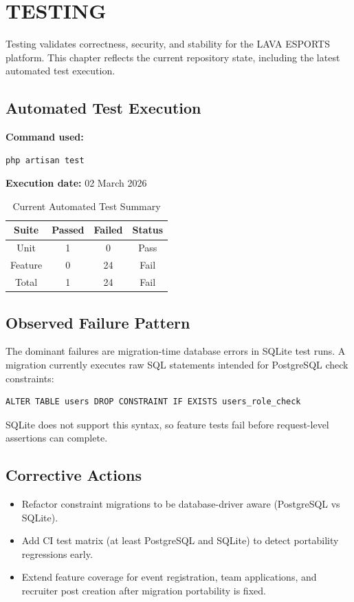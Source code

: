 \chapter{TESTING}
Testing validates correctness, security, and stability for the LAVA ESPORTS platform. This chapter reflects the current repository state, including the latest automated test execution.

\section{Automated Test Execution}
\textbf{Command used:}
\begin{verbatim}
php artisan test
\end{verbatim}

\textbf{Execution date:} 02 March 2026

\begin{table}[htbp]
    \centering
    \renewcommand{\arraystretch}{1.3}
    \begin{tabular}{|c|c|c|c|}
        \hline
        \textbf{Suite} & \textbf{Passed} & \textbf{Failed} & \textbf{Status} \\
        \hline
        Unit & 1 & 0 & Pass \\
        \hline
        Feature & 0 & 24 & Fail \\
        \hline
        Total & 1 & 24 & Fail \\
        \hline
    \end{tabular}
    \caption{Current Automated Test Summary}
    \label{tab:test_summary}
\end{table}

\section{Observed Failure Pattern}
The dominant failures are migration-time database errors in SQLite test runs. A migration currently executes raw SQL statements intended for PostgreSQL check constraints:
\begin{verbatim}
ALTER TABLE users DROP CONSTRAINT IF EXISTS users_role_check
\end{verbatim}
SQLite does not support this syntax, so feature tests fail before request-level assertions can complete.

\section{Corrective Actions}
\begin{itemize}
    \item Refactor constraint migrations to be database-driver aware (PostgreSQL vs SQLite).
    \item Add CI test matrix (at least PostgreSQL and SQLite) to detect portability regressions early.
    \item Extend feature coverage for event registration, team applications, and recruiter post creation after migration portability is fixed.
\end{itemize}

